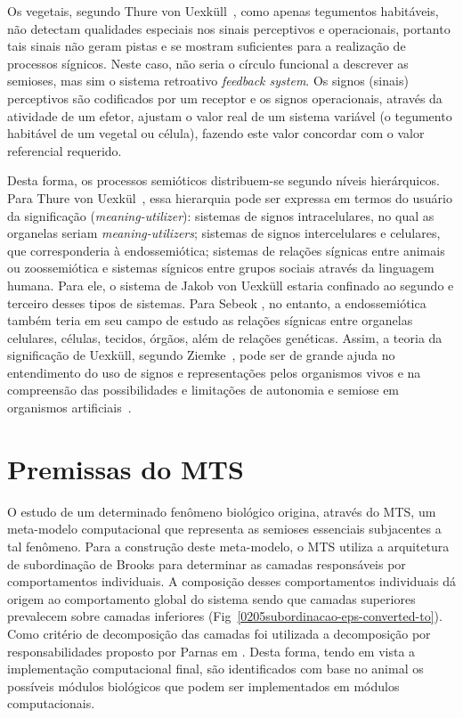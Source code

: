 Os vegetais, segundo Thure von Uexküll~\cite{thure04}, como apenas tegumentos habitáveis, não detectam qualidades especiais nos sinais perceptivos e operacionais, portanto tais sinais não geram pistas e se mostram suficientes para a realização de processos sígnicos.  Neste caso, não seria o círculo funcional a descrever as semioses, mas sim o sistema retroativo \textit{feedback system}. Os signos (sinais) perceptivos são codificados por um receptor e os signos operacionais, através da atividade de um efetor, ajustam o valor real de um sistema variável (o tegumento habitável de um vegetal ou célula), fazendo este valor concordar com o valor referencial requerido.

Desta forma, os processos semióticos distribuem-se segundo níveis hierárquicos. Para Thure von Uexkül~\cite{thure92}, essa hierarquia pode ser expressa em termos do usuário da significação (\textit{meaning-utilizer}): sistemas de signos intracelulares, no qual as organelas seriam  \textit{meaning-utilizers}; sistemas de signos intercelulares e celulares, que corresponderia à endossemiótica; sistemas de relações sígnicas entre animais ou zoossemiótica e sistemas sígnicos entre grupos sociais através da linguagem humana. Para ele, o sistema de Jakob von Uexküll estaria confinado ao segundo e terceiro desses tipos de sistemas. Para Sebeok \cite{sebeok99}, no entanto, a endossemiótica também teria em seu campo de estudo as relações sígnicas entre organelas celulares, células, tecidos, órgãos, além de relações genéticas. Assim, a teoria da significação de Uexküll, segundo Ziemke~\cite{ziemke01}, pode ser de grande ajuda no entendimento do uso de signos e representações pelos organismos vivos e na compreensão das possibilidades e limitações de autonomia e semiose em organismos artificiais~\cite{ziemke01}.

\section{Premissas do MTS}

O estudo de um determinado fenômeno biológico origina, através do MTS, um meta-modelo computacional que representa as semioses essenciais subjacentes a tal fenômeno. Para a construção deste meta-modelo, o MTS utiliza a arquitetura de subordinação de Brooks para determinar as camadas responsáveis por comportamentos individuais. A composição desses comportamentos individuais dá origem ao comportamento global do sistema sendo que camadas superiores prevalecem sobre camadas inferiores (Fig~\ref{0205subordinacao-eps-converted-to}). Como critério de decomposição das camadas foi utilizada a decomposição por responsabilidades proposto por Parnas em \cite{parnas72}. Desta forma, tendo em vista a implementação computacional final, são identificados com base no animal os possíveis módulos biológicos que podem ser implementados em módulos computacionais.

